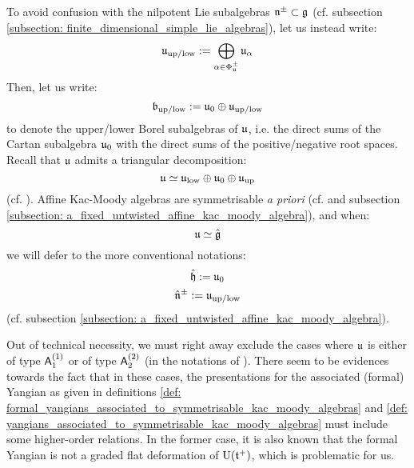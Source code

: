         To avoid confusion with the  nilpotent Lie subalgebras $\mathfrak{n}^{\pm} \subset \mathfrak{g}$ (cf. subsection \ref{subsection: finite_dimensional_simple_lie_algebras}), let us instead write:
            $$\mathfrak{u}_{\mathrm{up}/\mathrm{low}} := \bigoplus_{\alpha \in \Phi_{\mathfrak{u}}^{\pm}} \mathfrak{u}_{\alpha}$$
        Then, let us write:
            $$\mathfrak{b}_{\mathrm{up}/\mathrm{low}} := \mathfrak{u}_0 \oplus \mathfrak{u}_{\mathrm{up}/\mathrm{low}}$$
        to denote the upper/lower Borel subalgebras of $\mathfrak{u}$, i.e. the direct sums of the Cartan subalgebra $\mathfrak{u}_0$ with the direct sums of the positive/negative root spaces. Recall that $\mathfrak{u}$ admits a triangular decomposition:
            $$\mathfrak{u} \simeq \mathfrak{u}_{\mathrm{low}} \oplus \mathfrak{u}_0 \oplus \mathfrak{u}_{\mathrm{up}}$$
        (cf. \cite[Theorem 1.2]{kac_infinite_dimensional_lie_algebras}). Affine Kac-Moody algebras are symmetrisable \textit{a priori} (cf. \cite[Chapter 4]{kac_infinite_dimensional_lie_algebras} and subsection \ref{subsection: a_fixed_untwisted_affine_kac_moody_algebra}), and when:
            $$\mathfrak{u} \simeq \hat{\mathfrak{g}}$$
        we will defer to the more conventional notations:
            $$\hat{\mathfrak{h}} := \mathfrak{u}_0$$
            $$\hat{\mathfrak{n}}^{\pm} := \mathfrak{u}_{\mathrm{up}/\mathrm{low}}$$
        (cf. subsection \ref{subsection: a_fixed_untwisted_affine_kac_moody_algebra}).
            
        Out of technical necessity, we must right away exclude the cases where $\mathfrak{u}$ is either of type $\mathsf{A}_1^{(1)}$ or of type $\mathsf{A}_2^{(2)}$ (in the notations of \cite[Chapter 4]{kac_infinite_dimensional_lie_algebras}). There seem to be evidences towards the fact that in these cases, the presentations for the associated (formal) Yangian as given in definitions \ref{def: formal_yangians_associated_to_symmetrisable_kac_moody_algebras} and \ref{def: yangians_associated_to_symmetrisable_kac_moody_algebras} must include some higher-order relations. In the former case, it is also known that the formal Yangian is not a graded flat deformation of $\mathrm{U}(\mathfrak{t}^{+})$, which is problematic for us.

